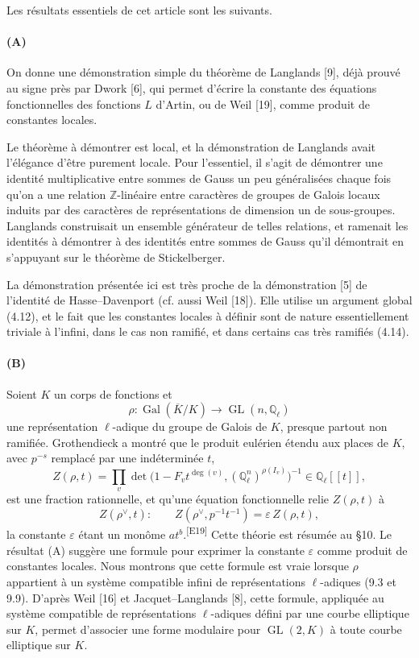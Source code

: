 \documentclass[10pt,letterpaper]{article}
\newcommand{\Q}{\mathbb Q}
\newcommand{\Z}{\mathbb Z}
\newcommand{\Gal}{\operatorname{Gal}}
\newcommand{\GL}{\operatorname{GL}}
\providecommand{\Gal}{\operatorname{Gal}}
\providecommand{\GL}{\operatorname{GL}}
\providecommand{\Gal}{\operatorname{Gal}}
\providecommand{\GL}{\operatorname{GL}}
\providecommand{\Gal}{\operatorname{Gal}}
\providecommand{\Gal}{\operatorname{Gal}}
\newcommand{\auditmark}[1]{\textsuperscript{\normalfont\scriptsize[E#1]}}
\begin{document}
Les résultats essentiels de cet article sont les suivants.

\paragraph{(A)} On donne une démonstration simple du théorème de Langlands [9], déjà prouvé au signe près par Dwork [6], qui permet d'écrire la constante des équations fonctionnelles des fonctions \(L\) d'Artin, ou de Weil [19], comme produit de constantes locales.

Le théorème à démontrer est local, et la démonstration de Langlands avait l'élégance d'être purement locale. Pour l'essentiel, il s'agit de démontrer une identité multiplicative entre sommes de Gauss un peu généralisées chaque fois qu'on a une relation \(\Z\)-linéaire entre caractères de groupes de Galois locaux induits par des caractères de représentations de dimension un de sous-groupes. Langlands construisait un ensemble générateur de telles relations, et ramenait les identités à démontrer à des identités entre sommes de Gauss qu'il démontrait en s'appuyant sur le théorème de Stickelberger.

La démonstration présentée ici est très proche de la démonstration [5] de l'identité de Hasse--Davenport (cf. aussi Weil [18]). Elle utilise un argument global (4.12), et le fait que les constantes locales à définir sont de nature essentiellement triviale à l'infini, dans le cas non ramifié, et dans certains cas très ramifiés (4.14).

\paragraph{(B)} Soient \(K\) un corps de fonctions et
\[
\rho:\Gal(\overline K/K)\longrightarrow \GL(n,\Q_\ell)
\]
une représentation \(\ell\)-adique du groupe de Galois de \(K\), presque partout non ramifiée. Grothendieck a montré que le produit eulérien étendu aux places de \(K\), avec \(p^{-s}\) remplacé par une indéterminée \(t\),
\[
Z(\rho,t)=\prod_v\det\bigl(1-F_vt^{\deg(v)},(\Q_\ell^n)^{\rho(I_v)}\bigr)^{-1}
\in\Q_\ell[[t]],
\]
est une fraction rationnelle, et qu'une équation fonctionnelle relie \(Z(\rho,t)\) à
\[
Z(\rho^\vee,t):
\qquad
Z(\rho^\vee,p^{-1}t^{-1})=\varepsilon\, Z(\rho,t),
\]
la constante \(\varepsilon\) étant un monôme \(at^b\).\auditmark{19} Cette théorie est résumée au §10. Le résultat (A) suggère une formule pour exprimer la constante \(\varepsilon\) comme produit de constantes locales. Nous montrons que cette formule est vraie lorsque \(\rho\) appartient à un système compatible infini de représentations \(\ell\)-adiques (9.3 et 9.9). D'après Weil [16] et Jacquet--Langlands [8], cette formule, appliquée au système compatible de représentations \(\ell\)-adiques défini par une courbe elliptique sur \(K\), permet d'associer une forme modulaire pour \(\GL(2,K)\) à toute courbe elliptique sur \(K\).
\end{document}
